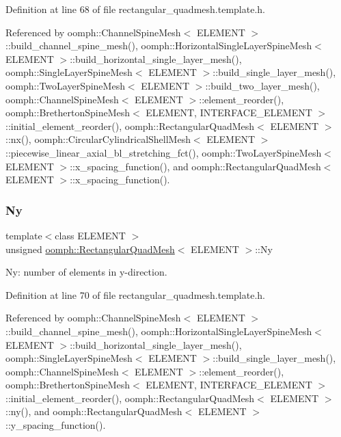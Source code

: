 Definition at line 68 of file rectangular\+\_\+quadmesh.\+template.\+h.



Referenced by oomph\+::\+Channel\+Spine\+Mesh$<$ E\+L\+E\+M\+E\+N\+T $>$\+::build\+\_\+channel\+\_\+spine\+\_\+mesh(), oomph\+::\+Horizontal\+Single\+Layer\+Spine\+Mesh$<$ E\+L\+E\+M\+E\+N\+T $>$\+::build\+\_\+horizontal\+\_\+single\+\_\+layer\+\_\+mesh(), oomph\+::\+Single\+Layer\+Spine\+Mesh$<$ E\+L\+E\+M\+E\+N\+T $>$\+::build\+\_\+single\+\_\+layer\+\_\+mesh(), oomph\+::\+Two\+Layer\+Spine\+Mesh$<$ E\+L\+E\+M\+E\+N\+T $>$\+::build\+\_\+two\+\_\+layer\+\_\+mesh(), oomph\+::\+Channel\+Spine\+Mesh$<$ E\+L\+E\+M\+E\+N\+T $>$\+::element\+\_\+reorder(), oomph\+::\+Bretherton\+Spine\+Mesh$<$ E\+L\+E\+M\+E\+N\+T, I\+N\+T\+E\+R\+F\+A\+C\+E\+\_\+\+E\+L\+E\+M\+E\+N\+T $>$\+::initial\+\_\+element\+\_\+reorder(), oomph\+::\+Rectangular\+Quad\+Mesh$<$ E\+L\+E\+M\+E\+N\+T $>$\+::nx(), oomph\+::\+Circular\+Cylindrical\+Shell\+Mesh$<$ E\+L\+E\+M\+E\+N\+T $>$\+::piecewise\+\_\+linear\+\_\+axial\+\_\+bl\+\_\+stretching\+\_\+fct(), oomph\+::\+Two\+Layer\+Spine\+Mesh$<$ E\+L\+E\+M\+E\+N\+T $>$\+::x\+\_\+spacing\+\_\+function(), and oomph\+::\+Rectangular\+Quad\+Mesh$<$ E\+L\+E\+M\+E\+N\+T $>$\+::x\+\_\+spacing\+\_\+function().

\mbox{\label{classoomph_1_1RectangularQuadMesh_a49a5ee7ef86ce837fb807eb6014a296d}} 
\subsubsection{\texorpdfstring{Ny}{Ny}}
{\footnotesize\ttfamily template$<$class E\+L\+E\+M\+E\+NT $>$ \\
unsigned \hyperlink{classoomph_1_1RectangularQuadMesh}{oomph\+::\+Rectangular\+Quad\+Mesh}$<$ E\+L\+E\+M\+E\+NT $>$\+::Ny\hspace{0.3cm}{\ttfamily [protected]}}



Ny\+: number of elements in y-\/direction. 



Definition at line 70 of file rectangular\+\_\+quadmesh.\+template.\+h.



Referenced by oomph\+::\+Channel\+Spine\+Mesh$<$ E\+L\+E\+M\+E\+N\+T $>$\+::build\+\_\+channel\+\_\+spine\+\_\+mesh(), oomph\+::\+Horizontal\+Single\+Layer\+Spine\+Mesh$<$ E\+L\+E\+M\+E\+N\+T $>$\+::build\+\_\+horizontal\+\_\+single\+\_\+layer\+\_\+mesh(), oomph\+::\+Single\+Layer\+Spine\+Mesh$<$ E\+L\+E\+M\+E\+N\+T $>$\+::build\+\_\+single\+\_\+layer\+\_\+mesh(), oomph\+::\+Channel\+Spine\+Mesh$<$ E\+L\+E\+M\+E\+N\+T $>$\+::element\+\_\+reorder(), oomph\+::\+Bretherton\+Spine\+Mesh$<$ E\+L\+E\+M\+E\+N\+T, I\+N\+T\+E\+R\+F\+A\+C\+E\+\_\+\+E\+L\+E\+M\+E\+N\+T $>$\+::initial\+\_\+element\+\_\+reorder(), oomph\+::\+Rectangular\+Quad\+Mesh$<$ E\+L\+E\+M\+E\+N\+T $>$\+::ny(), and oomph\+::\+Rectangular\+Quad\+Mesh$<$ E\+L\+E\+M\+E\+N\+T $>$\+::y\+\_\+spacing\+\_\+function().

